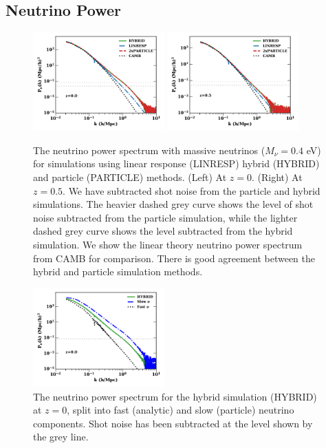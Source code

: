 \documentclass[useAMS, usenatbib]{mnras}
\begin{document}
\subsection{Neutrino Power}
\label{sec:nupower}

\begin{figure}
\includegraphics[width=0.45\textwidth]{nuplots/pks-nu-1.pdf}
\includegraphics[width=0.45\textwidth]{nuplots/pks-nu-0_6667.pdf}
  \caption{The neutrino power spectrum with massive neutrinos ($M_\nu = 0.4$ eV) for simulations using linear response (LINRESP) hybrid (HYBRID) and particle (PARTICLE) methods. (Left) At $z=0$. (Right) At $z=0.5$. We have subtracted shot noise from the particle and hybrid simulations. The heavier dashed grey curve shows the level of shot noise subtracted from the particle simulation, while the lighter dashed grey curve shows the level subtracted from the hybrid simulation. We show the linear theory neutrino power spectrum from CAMB for comparison. There is good agreement between the hybrid and particle simulation methods.}
  \label{fig:neutrino_power}
\end{figure}

\begin{figure}
\includegraphics[width=0.45\textwidth]{nuplots/pks-nu-split-1.pdf}
  \caption{The neutrino power spectrum for the hybrid simulation (HYBRID) at $z=0$, split into fast (analytic) and slow (particle) neutrino components. Shot noise has been subtracted at the level shown by the grey line.}
  \label{fig:neutrino_power_split}
\end{figure}
\end{document}
